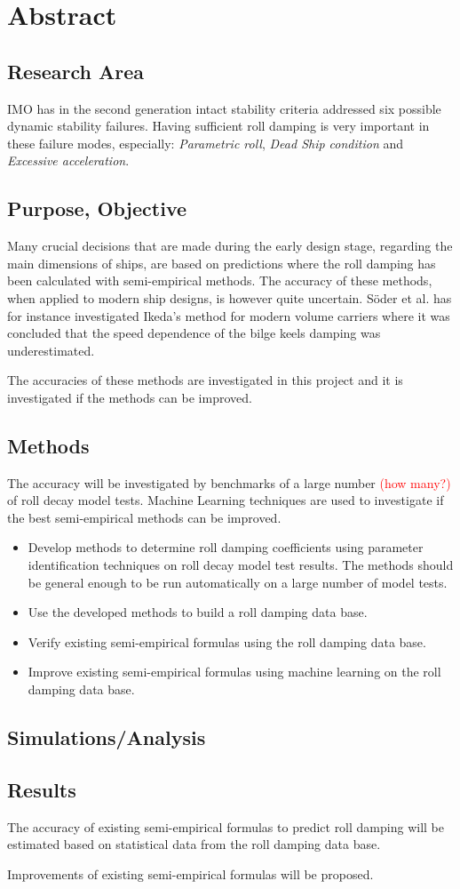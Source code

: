 \section{Abstract}
\label{se:abstract}
\subsection{Research Area}
IMO has in the second generation intact stability criteria \cite{imo_second_nodate} addressed six possible dynamic stability failures. Having sufficient roll damping is very important in these failure modes, especially: \emph{Parametric roll}, \emph{Dead Ship condition} and \emph{Excessive acceleration}.
		
\subsection{Purpose, Objective}
Many crucial decisions that are made during the early design stage, regarding the main dimensions of ships, are based on predictions where the roll damping has been calculated with semi-empirical methods. The accuracy of these methods, when applied to modern ship designs, is however quite uncertain. Söder et al. \cite{soder_ikeda_2019} has for instance investigated Ikeda’s method for modern volume carriers where it was concluded that the speed dependence of the bilge keels damping was underestimated.

The accuracies of these methods are investigated in this project and it is investigated if the methods can be improved.

\subsection{Methods}
The accuracy will be investigated by benchmarks of a large number \textcolor{red}{(how many?)} of roll decay model tests. Machine Learning techniques are used to investigate if the best semi-empirical methods can be improved.

\begin{itemize}
	\item Develop methods to determine roll damping coefficients using parameter identification techniques on roll decay model test results. The methods should be general enough to be run automatically on a large number of model tests.
    \item Use the developed methods to build a roll damping data base.
    \item Verify existing semi-empirical formulas using the roll damping data base.
    \item Improve existing semi-empirical formulas using machine learning on the roll damping data base.
\end{itemize}		
			
			
\subsection{Simulations/Analysis}

			
\subsection{Results}
The accuracy of existing semi-empirical formulas to predict roll damping will be estimated based on statistical data from the roll damping data base.

Improvements of existing semi-empirical formulas will be proposed. 